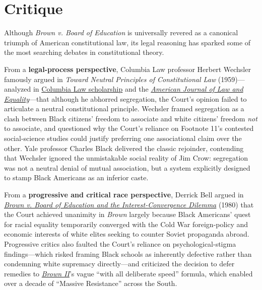 \documentclass[12pt]{article}
\begin{document}
\begin{enumerate}
\end{enumerate}

\section{Critique}

Although \textit{Brown v. Board of Education} is universally revered as a canonical triumph of American constitutional law, its legal reasoning has sparked some of the most searching debates in constitutional theory.

From a \textbf{legal-process perspective}, Columbia Law professor Herbert Wechsler famously argued in \textit{Toward Neutral Principles of Constitutional Law} (1959)---analyzed in \href{https://scholarship.law.columbia.edu/cgi/viewcontent.cgi?article=3132&context=faculty_scholarship}{Columbia Law scholarship} and the \href{https://direct.mit.edu/ajle/article/doi/10.1162/ajle_a_00068/125059/WHAT-BROWN-TAUGHT-US-ABOUT-THE-CONSTITUTION}{\textit{American Journal of Law and Equality}}---that although he abhorred segregation, the Court's opinion failed to articulate a neutral constitutional principle. Wechsler framed segregation as a clash between Black citizens' freedom to associate and white citizens' freedom \textit{not} to associate, and questioned why the Court's reliance on Footnote 11's contested social-science studies could justify preferring one associational claim over the other. Yale professor Charles Black delivered the classic rejoinder, contending that Wechsler ignored the unmistakable social reality of Jim Crow: segregation was not a neutral denial of mutual association, but a system explicitly designed to stamp Black Americans as an inferior caste.

From a \textbf{progressive and critical race perspective}, Derrick Bell argued in \href{https://yale.imodules.com/s/1667/images/gid6/editor_documents/bellinterest.pdf}{\textit{Brown v. Board of Education and the Interest-Convergence Dilemma}} (1980) that the Court achieved unanimity in \textit{Brown} largely because Black Americans' quest for racial equality temporarily converged with the Cold War foreign-policy and economic interests of white elites seeking to counter Soviet propaganda abroad. Progressive critics also faulted the Court's reliance on psychological-stigma findings---which risked framing Black schools as inherently defective rather than condemning white supremacy directly---and criticized the decision to defer remedies to \href{https://supreme.justia.com/cases/federal/us/349/294/}{\textit{Brown II}}'s vague ``with all deliberate speed'' formula, which enabled over a decade of ``Massive Resistance'' across the South.
\end{document}

